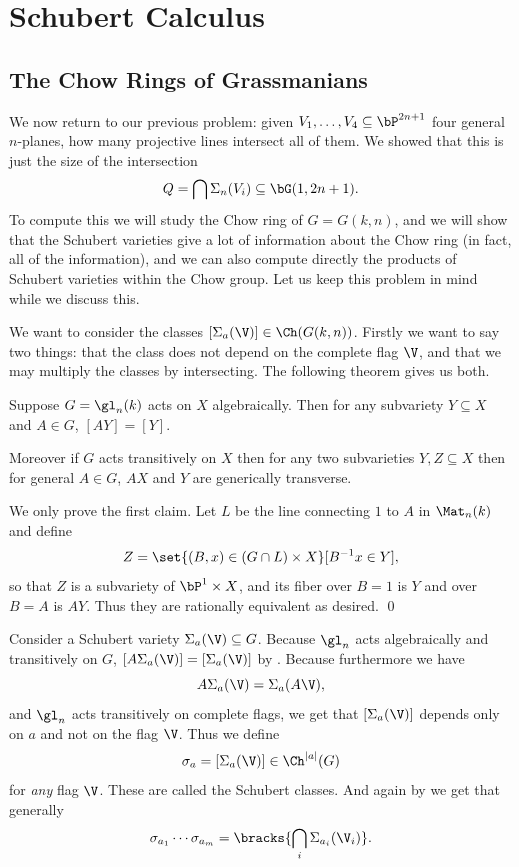 \section{Schubert Calculus}

\subsection{The Chow Rings of Grassmanians}

We now return to our previous problem: given $V_1,\dots,V_4\subseteq\bP^{2n+1}$ four general $n$-planes,
how many projective lines intersect all of them.
We showed that this is just the size of the intersection
$$ Q = \bigcap\Sigma_n(V_i) \subseteq \bG(1,2n+1) . $$
To compute this we will study the Chow ring of $G=G(k,n)$, and we will show that the Schubert varieties
give a lot of information about the Chow ring (in fact, all of the information), and we can also compute
directly the products of Schubert varieties within the Chow group.
Let us keep this problem in mind while we discuss this.

We want to consider the classes $[\Sigma_a(\V)]\in\Ch(G(k,n))$.
Firstly we want to say two things: that the class does not depend on the complete flag $\V$, and that we
may multiply the classes by intersecting.
The following theorem gives us both.

\bthrm[name={kleiman}, title={Kleiman, special case}]

    Suppose $G=\gl_n(k)$ acts on $X$ algebraically.
    Then for any subvariety $Y\subseteq X$ and $A\in G$, $[AY]=[Y]$.

    Moreover if $G$ acts transitively on $X$ then for any two subvarieties $Y,Z\subseteq X$ then for
    general $A\in G$, $AX$ and $Y$ are generically transverse.

\ethrm

\bproof

    We only prove the first claim.
    Let $L$ be the line connecting $1$ to $A$ in $\Mat_n(k)$ and define
    $$ Z = \set{(B,x)\in(G\cap L)\times X}[B^{-1}x\in Y] , $$
    so that $Z$ is a subvariety of $\bP^1\times X$, and its fiber over $B=1$ is $Y$ and over $B=A$ is $AY$.
    Thus they are rationally equivalent as desired.
    \qed

\eproof


Consider a Schubert variety $\Sigma_a(\V)\subseteq G$.
Because $\gl_n$ acts algebraically and transitively on $G$, $[A\Sigma_a(\V)]=[\Sigma_a(\V)]$ by
.
Because furthermore we have
$$ A\Sigma_a(\V) = \Sigma_a(A\V) , $$
and $\gl_n$ acts transitively on complete flags, we get that $[\Sigma_a(\V)]$ depends only on $a$ and not on
the flag $\V$.
Thus we define
$$ \sigma_a = [\Sigma_a(\V)] \in \Ch^{\abs a}(G) $$
for {\it any\/} flag $\V$.
These are called the {\emphcolor Schubert classes}.
And again by  we get that generally
$$ \sigma_{a_1}\cdots\sigma_{a_m} = \bracks{\bigcap_i\Sigma_{a_i}(\V_i)} . $$

